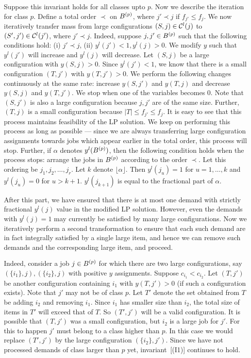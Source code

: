 Suppose this invariant holds for all classes upto $p$. Now we describe the iteration for class $p$.
Define a total order $\prec$ on $B^{(p)}$, where $j' \prec j$ if $f_{j'} \leq f_{j}$.  We now iteratively transfer mass from large configurations $(S,j) \in {\cal C}^l(j)$ to $(S',j') \in {\cal C}^l(j')$, where $j' \prec j$. Indeed, suppose $j,j' \in B^{(p)}$ such that the following conditions hold: (i) $j' \prec j$, (ii) $y^l(j') < 1, y^l(j) > 0$. We modify $y$ such that
$y^l(j')$ will increase and $y^l(j)$ will decrease. Let $(S,j)$ be a large configuration with $y(S,j) > 0$. Since $y^l(j') < 1$, we know that there is a small configuration $(T,j')$ with $y(T,j') > 0$. We perform the following changes continuously at the same rate: increase $y(S,j')$ and $y(T,j)$ and decrease $y(S,j)$ and $y(T,j')$. We stop when one of the variables becomes 0. Note that $(S,j')$ is also a large configuration because $j,j'$ are of the same size. Further, $(T,j)$ is a small configuration because $|T| \leq f_{j'} \leq f_j$. It is easy to see that this process maintains feasibility of the LP solution. We keep on performing this process as long as possible --- since we are always transferring large configuration assignments towards jobs which appear earlier in the total order, this process will stop. Further, if $\alpha$ denotes $y^l(B^{(p)})$, then the following condition holds when the process stops: arrange the jobs in $B^{(p)}$ according to the order $\prec$. Let this ordering be $j_1, j_2, \ldots, j_r$. Let $k$ denote $\lfloor \alpha \rfloor$. Then $y^l(j_u) = 1$ for $u=1, \ldots, k$ and $y^l(j_u) = 0$ for $u > k+1$. $y^l(j_{k+1})$ is equal to the fractional part of $\alpha$.

After this part, we have ensured that there is at most one demand with strictly fractional $y^l(j)$ value in the modified LP solution. However, even the demands with $y^l(j) = 1$ may currently be satisfied by many large configurations. Now we iteratively perform a second transformation to ensure that each such demand are in fact integrally satisfied by a single large item, and hence we can remove such demands and the corresponding large item, and proceed.

Indeed, consider a  job $j \in B^{(p)}$ for which there are two large configurations, say $(\{i_1\}, j), (\{i_2\}, j)$ with positive $y$ assignments. Suppose $c_{i_1} < c_{i_2}$. Let $(T,j')$ be another configuration containing $i_1$ with $y(T,j') > 0$ (if such a configuration exists). Note that $j'$ may not be of class $p$. Let $T'$ denote the set obtained from $T$ be adding $i_2$ and removing $i_1$. Since $i_1$ has smaller size than $i_2$, the total size of items in $T'$ will exceed that of $T$. So $(T',j')$ will be a valid configuration. It is possible that $(T,j')$ was a small configuration, but $i_2$ is a large job for $j'$. For this to happen $j'$ must belong to a class higher than $p$. In this case we would replace $(T',j')$ by the large configuration $(\{i_2\},j')$. Since we have not processed demands of class larger than $p$ yet, invariant~[(I1)] continues to hold.

